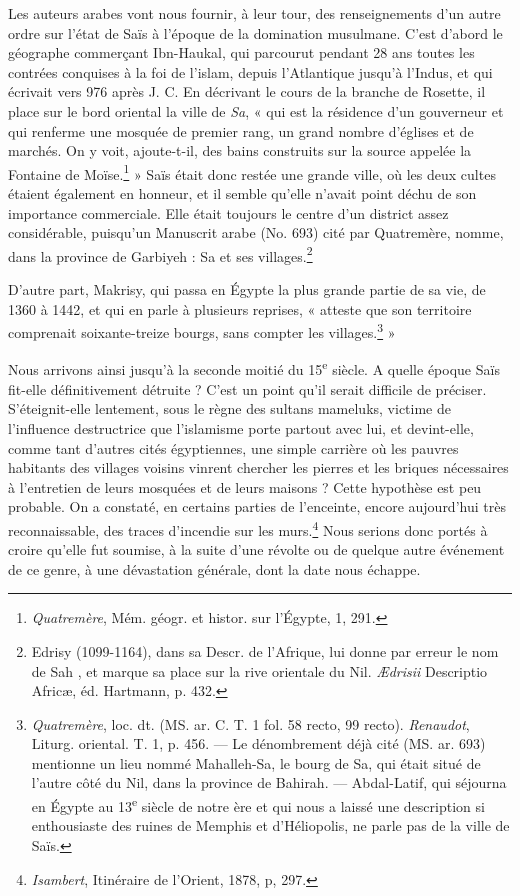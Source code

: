 \documentclass[a4paper, 11pt, oneside]{article}
\begin{document}
Les auteurs arabes vont nous fournir, à leur tour, des renseignements d'un autre ordre sur l'état de Saïs à l'époque de la domination musulmane.
\clearpage
C'est d'abord le géographe commerçant Ibn-Haukal, qui parcourut pendant 28 ans toutes les contrées conquises à la foi de l'islam, depuis l'Atlantique jusqu'à l'Indus, et qui écrivait vers 976 après J. C. En décrivant le cours de la branche de Rosette, il place sur le bord oriental la ville de \emph{Sa}, « qui est la résidence d'un gouverneur et qui renferme une mosquée de premier rang, un grand nombre d'églises et de marchés. On y voit, ajoute-t-il, des bains construits sur la source appelée la Fontaine de Moïse.\footnote{\emph{Quatremère}, Mém. géogr. et histor. sur l'Égypte, 1, 291.} » Saïs était donc restée une grande ville, où les deux cultes étaient également en honneur, et il semble qu'elle n'avait point déchu de son importance commerciale. Elle était toujours le centre d'un district assez considérable, puisqu'un Manuscrit arabe (No. 693) cité par Quatremère, nomme, dans la province de Garbiyeh : Sa et ses villages.\footnote{Edrisy (1099-1164), dans sa Descr. de l'Afrique, lui donne par erreur le nom de Sah , et marque sa place sur la rive orientale du Nil. \emph{Ædrisii} Descriptio Africæ, éd. Hartmann, p. 432.}

D'autre part, Makrisy, qui passa en Égypte la plus grande partie de sa vie, de 1360 à 1442, et qui en parle à plusieurs reprises, « atteste que son territoire comprenait soixante-treize bourgs, sans compter les villages.\footnote{\emph{Quatremère}, loc. dt. (MS. ar. C. T. 1 fol. 58 recto, 99 recto). \emph{Renaudot}, Liturg. oriental. T. 1, p. 456. --- Le dénombrement déjà cité (MS. ar. 693) mentionne un lieu nommé Mahalleh-Sa, le bourg de Sa, qui était situé de l'autre côté du Nil, dans la province de Bahirah. --- Abdal-Latif, qui séjourna en Égypte au 13\textsuperscript{e} siècle de notre ère et qui nous a laissé une description si enthousiaste des ruines de Memphis et d'Héliopolis, ne parle pas de la ville de Saïs.} »

Nous arrivons ainsi jusqu'à la seconde moitié du 15\textsuperscript{e} siècle. A quelle époque Saïs fit-elle définitivement détruite ? C'est un point qu'il serait difficile de préciser. S'éteignit-elle lentement, sous le règne des sultans mameluks, victime de l'influence destructrice que l'islamisme porte partout avec lui, et devint-elle, comme tant d'autres cités égyptiennes, une simple carrière où les pauvres habitants des villages voisins vinrent chercher les pierres et les briques nécessaires à l'entretien de leurs mosquées et de leurs maisons ? Cette hypothèse est peu probable. On a constaté, en certains parties de l'enceinte, encore aujourd'hui très reconnaissable, des traces d'incendie sur les murs.\footnote{\emph{Isambert}, Itinéraire de l'Orient, 1878, p, 297.} Nous serions donc portés à croire qu'elle fut soumise, à la suite d'une révolte ou de quelque autre événement de ce genre, à une dévastation générale, dont la date nous échappe.
\end{document}
